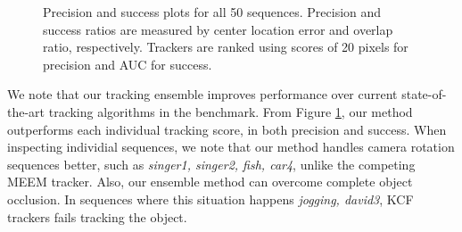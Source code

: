 \begin{figure}[h!]
\centering
{}
\caption[Precision and success plots for all 50 sequences]{\small  Precision and success plots for all 50 sequences. Precision and success
		ratios are measured by center location error and overlap ratio,
		respectively. Trackers are ranked using scores of 20 pixels for
		precision and AUC for success.}
\label{fig:results}
\end{figure}

We note that our tracking ensemble improves performance over current
state-of-the-art tracking algorithms in the benchmark.
From Figure \ref{fig:results}, our method outperforms each individual tracking
score, in both precision and success.
When inspecting individial sequences, we note that 
our method handles camera rotation sequences better, such as \textit{singer1, 
singer2, fish, car4}, unlike the competing
MEEM tracker. Also, our ensemble method can overcome complete object occlusion. In
sequences where this situation happens \textit{jogging, david3}, KCF trackers
fails tracking the object. 

